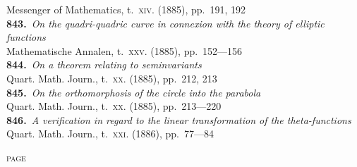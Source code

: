 \documentclass[11pt,a4paper]{article}
\providecommand{\textsc}[1]{{\scshape #1}}
\begin{document}
\hspace*{2em}Messenger of Mathematics, t.~\textsc{xiv}. (1885), pp.~191, 192\\[0.3em]
\textbf{843.}~\textit{On the quadri-quadric curve in connexion with the theory of elliptic functions}~\\
\hspace*{2em}Mathematische Annalen, t.~\textsc{xxv}. (1885), pp.~152---156\\[0.3em]
\textbf{844.}~\textit{On a theorem relating to seminvariants}~\\
\hspace*{2em}Quart. Math. Journ., t.~\textsc{xx}. (1885), pp.~212, 213\\[0.3em]
\textbf{845.}~\textit{On the orthomorphosis of the circle into the parabola}~\\
\hspace*{2em}Quart. Math. Journ., t.~\textsc{xx}. (1885), pp.~213---220\\[0.3em]
\textbf{846.}~\textit{A verification in regard to the linear transformation of the theta-functions}~\\
\hspace*{2em}Quart. Math. Journ., t.~\textsc{xxi}. (1886), pp.~77---84

\clearpage

\thispagestyle{plain}
\vspace*{1em}
\hfill\textsc{page}
\end{document}

